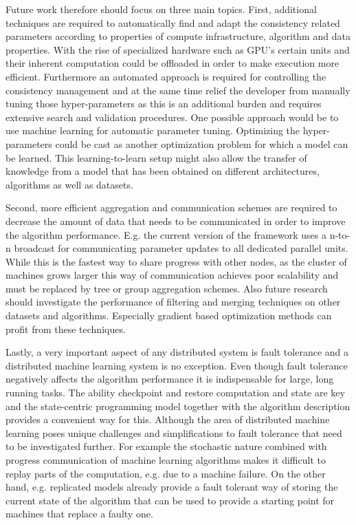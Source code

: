 Future work therefore should focus on three main topics.
First, additional techniques are required to automatically find and adapt the consistency related parameters according to properties of compute infrastructure, algorithm and data properties.
With the rise of specialized hardware such as GPU's certain units and their inherent computation could be offloaded in order to make execution more efficient.
Furthermore an automated approach is required for controlling the consistency management and at the same time relief the developer from manually tuning those hyper-parameters as this is an additional burden and requires extensive search and validation procedures.
One possible approach would be to use machine learning for automatic parameter tuning.
Optimizing the hyper-parameters could be cast as another optimization problem for which a model can be learned.
This learning-to-learn setup might also allow the transfer of knowledge from a model that has been obtained on different architectures, algorithms as well as datasets.

Second, more efficient aggregation and communication schemes are required to decrease the amount of data that needs to be communicated in order to improve the algorithm performance.
E.g. the current version of the framework uses a n-to-n broadcast for communicating parameter updates to all dedicated parallel units.
While this is the fastest way to share progress with other nodes, as the cluster of machines grows larger this way of communication achieves poor scalability and must be replaced by tree or group aggregation schemes.
Also future research should investigate the performance of filtering and merging techniques on other datasets and algorithms. Especially gradient based optimization methods can profit from these techniques.

Lastly, a very important aspect of any distributed system is fault tolerance and a distributed machine learning system is no exception.
Even though fault tolerance negatively affects the algorithm performance it is indispensable for large, long running tasks.
The ability checkpoint and restore computation and state are key and the state-centric programming model together with the algorithm description provides a convenient way for this.
Although the area of distributed machine learning poses unique challenges and simplifications to fault tolerance that need to be investigated further.
For example the stochastic nature combined with progress communication of machine learning algorithms makes it difficult to replay parts of the computation, e.g. due to a machine failure.
On the other hand, e.g. replicated models already provide a fault tolerant way of storing the current state of the algorithm that can be used to provide a starting point for machines that replace a faulty one.